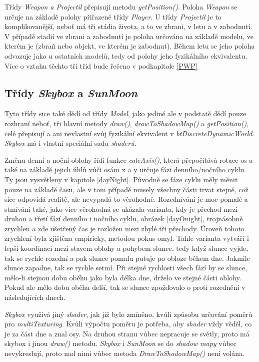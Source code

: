 Třídy \emph{Weapon a Projectil} přepisují metodu \emph{getPosition()}. Poloha \emph{Weapon} se určuje na základě polohy přiřazené třídy \emph{Player}. U třídy \emph{Projectil} je to komplikovanější, neboť má tři stádia života, a to ve zbrani, v letu a v zabodnutí. V případě stadií ve zbrani a zabodnutí je poloha určována na základě modelu, ve kterém je (zbraň nebo objekt, ve kterém je zabodnut). Během letu se jeho poloha odvozuje jako u ostatních modelů, tedy od polohy jeho fyzikálního ekvivalentu. Více o vztahu těchto tří tříd bude řečeno v podkapitole \ref{PWP}
\subsection{Třídy \emph{Skybox} a \emph{SunMoon}}
Tyto třídy sice také dědí od třídy \emph{Model}, jako jediné ale v podstatě dědí pouze rozhraní neboť, tři hlavní metody \emph{draw()}, \emph{drawToShadowMap()} a \emph{getPosition()}, celé přepisují a ani nevlastní svůj fyzikální ekvivalent v \emph{btDiscreteDynamicWorld}. \emph{Skybox} má i vlastní speciální sadu \emph{shaderů}.

Změnu denní a noční oblohy řídí funkce \emph{calcAxis()}, která přepočítává rotace os a také na základě jejich úhlů vůči osám x a y určuje fázi denního/nočního cyklu. Ty jsou vysvětleny v kapitole \ref{dayNight}. Původně se fáze cyklu měly měnit pouze na základě času, ale v tom případě musely všechny části trvat stejně, což sice odpovídá realitě, ale nevypadá to věrohodně. Rozednívání je moc pomalé a stmívání také, jako více věrohodná  se ukázala varianta, kdy je přechod mezi druhou a třetí  fází denního i nočního cyklu, obrázek \ref{dayOnight}, trojnásobně zrychlen a zde ušetřený čas je rozložen mezi zbylé tři přechody. Úroveň tohoto zrychlení byla zjištěna empiricky, metodou pokus omyl. Tahle varianta vytváří i lepší koordinaci mezi stavem oblohy a pohybem slunce, tedy když slunce vyjde, tak se rychle rozední a pak slunce pomalu putuje po obloze během dne. Jakmile slunce zapadne, tak se rychle setmí. Při stejné rychlosti všech fází by se slunce, mělo-li stejnou dobu oběhu jako byla délka dne, drželo ve stejné části oblohy. Pokud ale mělo dobu oběhu delší, tak se slunce zpožďovalo o proti rozednění v následujících dnech. 

\emph{Skybox} využívá jiný \emph{shader}, jak již bylo zmíněno, kvůli způsobu určování poměrů pro \emph{multiTexturing}. Kvůli výpočtu poměru je potřeba, aby \emph{shader} vždy věděl, co je za část dne a znal osy. Na druhou stranu vůbec nepracuje se světly, proto má skybox i jinou \emph{draw()} metodu. \emph{Skybox} i \emph{SunMoon} se do \emph{shadow mapy} vůbec nevykreslují, proto nad nimi vůbec metoda \emph{DrawToShadowMap()} není volána.

